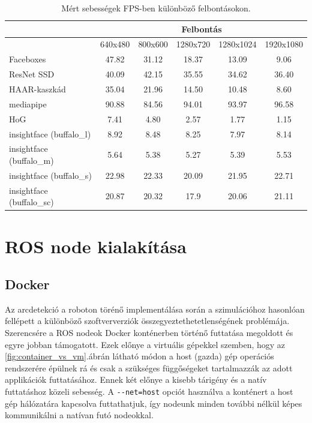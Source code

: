 \begin{table}[!ht]
    \footnotesize
    \centering
    \renewcommand{\arraystretch}{1.5}
    \begin{tabular} {|l | c | c | c | c | c |}
        \hline
        & \multicolumn{5}{|c|}{Felbontás} \\
        \hline
        & 640x480 & 800x600 & 1280x720 & 1280x1024 & 1920x1080 \\
        \hline
        Faceboxes & 47.82 & 31.12 & 18.37 & 13.09 & 9.06 \\
        \hline
        ResNet SSD & 40.09 & 42.15 & 35.55 & 34.62 &  36.40\\
        \hline
        HAAR-kaszkád & 35.04 & 21.96 & 14.50 & 10.48 & 8.60 \\
        \hline
        mediapipe & 90.88 & 84.56 & 94.01 & 93.97 & 96.58 \\
        \hline
        HoG & 7.41 & 4.80 & 2.57 & 1.77 & 1.15 \\
        \hline
        insightface (buffalo\_l) & 8.92 & 8.48 & 8.25 & 7.97 & 8.14 \\
        \hline
        insightface (buffalo\_m) & 5.64 & 5.38 & 5.27 & 5.39 & 5.53 \\
        \hline
        insightface (buffalo\_s) & 22.98 & 22.33 & 20.09 & 21.95 & 22.71 \\
        \hline
        insightface (buffalo\_sc) & 20.87 & 20.32 & 17.9 & 20.06 & 21.11 \\
        \hline
    \end{tabular}
    \caption{Mért sebességek FPS-ben különböző felbontásokon.}
    \label{tab:video_speed_results}
\end{table}

\section{ROS node kialakítása}
\subsection{Docker}
Az arcdetekció a roboton törénő implementálása során a szimulációhoz hasonlóan fellépett a különböző szoftververziók összegyeztethetetlenségének problémája. Szerencsére a ROS nodeok Docker\cite{noauthor_docker_nodate} konténerben történő futtatása megoldott és egyre jobban támogatott. Ezek előnye a virtuális gépekkel szemben, hogy az \ref{fig:container_vs_vm}.ábrán látható módon a host (gazda) gép operációs rendszerére épülnek rá és csak a szükséges függőségeket tartalmazzák az adott applikációk futtatásához. Ennek két előnye a kisebb tárigény és a natív futtatáshoz közeli sebesség\cite{felter_updated_2015}. A \lstinline{--net=host} opciót használva a konténert a host gép hálózatára kapcsolva futtathatjuk, így nodeunk minden további nélkül képes kommunikálni a natívan futó nodeokkal.

